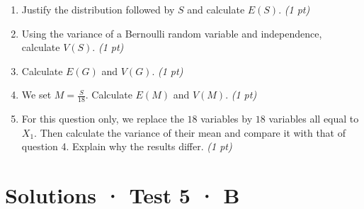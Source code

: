 \begin{enumerate}

\item Justify the distribution followed by $S$ and calculate $E(S)$. \hfill\textit{(1 pt)}

\item Using the variance of a Bernoulli random variable and independence, calculate $V(S)$. \hfill\textit{(1 pt)}

\item Calculate $E(G)$ and $V(G)$. \hfill\textit{(1 pt)}

\item We set $M=\frac S{18}$. Calculate $E(M)$ and $V(M)$. \hfill\textit{(1 pt)}

\item For this question only, we replace the $18$ variables by $18$ variables all equal to $X_1$. Then calculate the variance of their mean and compare it with that of question 4. Explain why the results differ. \hfill\textit{(1 pt)}

\end{enumerate}

\ifprof\clearpage

\section*{Solutions · Test 5 · B}\label{cor:7-4}

